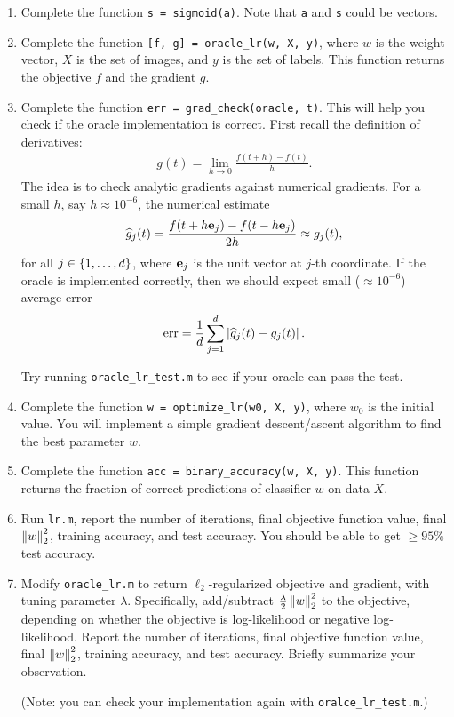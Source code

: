 \begin{enumerate}
\item 
Complete the function {\tt s = sigmoid(a)}. 
Note that {\tt a} and {\tt s} could be vectors. 

\item 
Complete the function {\tt [f, g] = oracle\_lr(w, X, y)},
where $ w $ is the weight vector, 
$ X $ is the set of images, and $ y $ is the set of labels. 
This function returns the objective $ f $ and the gradient $ g $. 

\item Complete the function {\tt err = grad\_check(oracle, t)}. 
This will help you check if the oracle implementation is correct. 
First recall the definition of derivatives:
\begin{align}
g(t)
= \lim\limits_{h \to 0} \frac{f(t + h) - f(t)}{h}.
\end{align}
The idea is to check analytic gradients against numerical gradients. 
For a small $ h $, say $ h \approx 10^{-6} $, 
the numerical estimate
\begin{align}
\widehat{g}_j (t)
= \frac{f(t+h \mathbf{e}_j) - f(t-h\mathbf{e}_j)}{2h}
\approx g_j(t), 
\end{align} 
for all $ j \in \left\lbrace 1,\dotsc, d \right\rbrace $, where $ \mathbf{e}_j $ is the unit vector at $ j $-th coordinate. 
If the oracle is implemented correctly, then we should expect small (\eg $ \approx 10^{-6} $) average error 
\begin{align}
{\rm err} 
= \frac{1}{d} \sum_{j=1}^{d} \left| \widehat{g}_j (t) - g_j (t) \right|.
\end{align}

Try running {\tt oracle\_lr\_test.m} to see if your oracle can pass the test.


\item 
Complete the function {\tt w = optimize\_lr(w0, X, y)}, 
where $ w_0 $ is the initial value. 
You will implement a simple gradient descent/ascent algorithm to find the best parameter $ w $. 

\item 
Complete the function {\tt acc = binary\_accuracy(w, X, y)}. 
This function returns the fraction of correct predictions of classifier $ w $ on data $ X $. 

\item 
Run {\tt lr.m}, report the number of iterations, final objective function value, final $ \left\| w \right\|_2^2 $, training accuracy, and test accuracy.
You should be able to get $ \ge 95\% $ test accuracy. 

\item 
Modify {\tt oracle\_lr.m} to return $ \ell_2 $-regularized objective and  gradient, with tuning parameter $ \lambda $.
Specifically, add/subtract $ \frac{\lambda}{2} \left\| w \right\|_2^2 $ to the objective, depending on whether the objective is log-likelihood or negative log-likelihood.
Report the number of iterations, final objective function value, final $ \left\| w \right\|_2^2 $, training accuracy, and test accuracy.
Briefly summarize your observation. 

(Note: you can check your implementation again with {\tt oralce\_lr\_test.m}.)

\end{enumerate}



